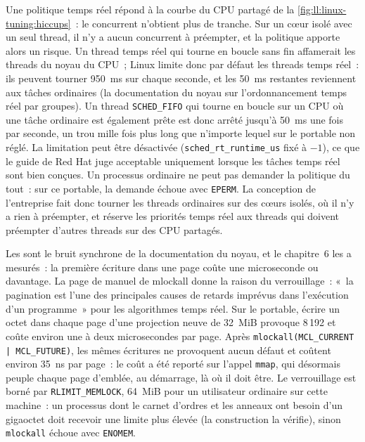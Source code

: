 Une politique temps réel répond à la courbe du CPU partagé de la \cref{fig:ll:linux-tuning:hiccups}~: le concurrent n'obtient plus de tranche.
Sur un cœur isolé avec un seul thread, il n'y a aucun concurrent à préempter, et la politique apporte alors un risque. Un thread temps réel
qui tourne en boucle sans fin affamerait les threads du noyau du CPU~; Linux limite donc par défaut les threads temps réel~: ils peuvent tourner
\qty{950}{\milli\second} sur chaque seconde, et les \qty{50}{\milli\second} restantes reviennent aux tâches ordinaires (la documentation du noyau
sur l'ordonnancement temps réel par groupes). Un thread \texttt{SCHED\_FIFO} qui tourne en boucle sur un CPU où une tâche ordinaire est également prête
est donc arrêté jusqu'à \qty{50}{\milli\second} une fois par seconde, un trou mille fois plus long que n'importe lequel sur le
portable non réglé. La limitation peut être désactivée (\texttt{sched\_rt\_runtime\_us} fixé à $-1$), ce que le guide de Red Hat
juge acceptable uniquement lorsque les tâches temps réel sont bien conçues. Un processus ordinaire ne peut pas demander la politique du tout~: sur ce
portable, la demande échoue avec \texttt{EPERM}. La conception de l'entreprise fait donc tourner les threads ordinaires sur des cœurs isolés, où
il n'y a rien à préempter, et réserve les priorités temps réel aux threads qui doivent préempter d'autres threads sur des CPU partagés.

Les  sont le bruit synchrone de la documentation du noyau, et le chapitre~6 les a mesurés~: la première écriture dans une page
coûte une microseconde ou davantage. La page de manuel de mlockall donne la raison du verrouillage~: «~la pagination est l'une des principales causes de retards imprévus
dans l'exécution d'un programme~» pour les algorithmes temps réel. Sur le portable, écrire un octet dans chaque page d'une projection neuve de 32~MiB
provoque 8\,192  et coûte environ une à deux microsecondes par page. Après \texttt{mlockall(MCL\_CURRENT | MCL\_FUTURE)}, les
mêmes écritures ne provoquent aucun défaut et coûtent environ \qty{35}{\nano\second} par page~: le coût a été reporté sur l'appel \texttt{mmap}, qui désormais
peuple chaque page d'emblée, au démarrage, là où il doit être. Le verrouillage est borné par \texttt{RLIMIT\_MEMLOCK}, 64~MiB pour un
utilisateur ordinaire sur cette machine~: un processus dont le carnet d'ordres et les anneaux ont besoin d'un gigaoctet doit recevoir une limite plus élevée (la construction la vérifie),
sinon \texttt{mlockall} échoue avec \texttt{ENOMEM}.

